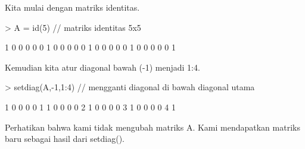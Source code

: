 \documentclass[a4paper,10pt]{article}
\begin{document}
\begin{eulernotebook}
\begin{eulercomment}
\begin{eulercomment}
\begin{eulercomment}
\begin{eulercomment}
\begin{eulercomment}
\begin{eulercomment}
\begin{eulercomment}
Kita mulai dengan matriks identitas.
\end{eulercomment}
\begin{eulerprompt}
> A = id(5) // matriks identitas 5x5
\end{eulerprompt}
\begin{euleroutput}
              1             0             0             0             0 
              0             1             0             0             0 
              0             0             1             0             0 
              0             0             0             1             0 
              0             0             0             0             1 
\end{euleroutput}
\begin{eulercomment}
Kemudian kita atur diagonal bawah (-1) menjadi 1:4.
\end{eulercomment}
\begin{eulerprompt}
> setdiag(A,-1,1:4) // mengganti diagonal di bawah diagonal utama
\end{eulerprompt}
\begin{euleroutput}
              1             0             0             0             0 
              1             1             0             0             0 
              0             2             1             0             0 
              0             0             3             1             0 
              0             0             0             4             1 
\end{euleroutput}
\begin{eulercomment}
Perhatikan bahwa kami tidak mengubah matriks A. Kami mendapatkan
matriks baru sebagai hasil dari setdiag().


\end{eulercomment}
\end{eulercomment}
\end{eulercomment}
\end{eulercomment}
\end{eulercomment}
\end{eulercomment}
\end{eulercomment}
\end{eulernotebook}
\end{document}
